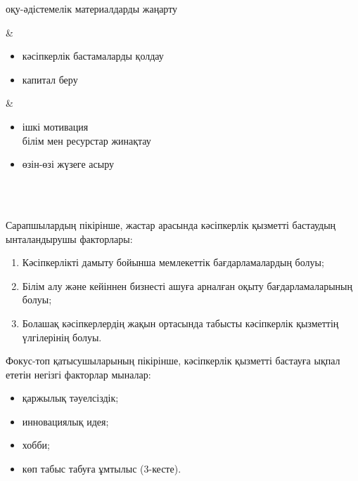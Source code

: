 \begin{longtable}[]
\begin{minipage}[t]{\linewidth}
\begin{itemize}
    оқу-әдістемелік материалдарды жаңарту
  \end{itemize}
  \end{minipage} & \begin{minipage}[t]{\linewidth}\raggedright
  \begin{itemize}
  \item
    кәсіпкерлік бастамаларды қолдау
  \item
    капитал беру
  \end{itemize}
  \end{minipage} & \begin{minipage}[t]{\linewidth}\raggedright
  \begin{itemize}
  \item
    ішкі мотивация\\
    білім мен ресурстар жинақтау
  \item
    өзін-өзі жүзеге асыру
  \end{itemize}\strut
  \end{minipage} \\ \hline
   \\ \hline
  \end{longtable}
  

\begin{multicols}{2}

Сарапшылардың пікірінше, жастар арасында кәсіпкерлік қызметті бастаудың
ынталандырушы факторлары:

\begin{enumerate}
\def\labelenumi{\arabic{enumi}.}
\item
  Кәсіпкерлікті дамыту бойынша мемлекеттік бағдарламалардың болуы;
\item
  Білім алу және кейіннен бизнесті ашуға арналған оқыту
  бағдарламаларының болуы;
\item
  Болашақ кәсіпкерлердің жақын ортасында табысты кәсіпкерлік қызметтің
  үлгілерінің болуы.
\end{enumerate}

Фокус-топ қатысушыларының пікірінше, кәсіпкерлік қызметті бастауға ықпал
ететін негізгі факторлар мыналар:

\begin{itemize}
\item
  қаржылық тәуелсіздік;
\item
  инновациялық идея;
\item
  хобби;
\item
  көп табыс табуға ұмтылыс (3-кесте).
\end{itemize}
\end{multicols}

